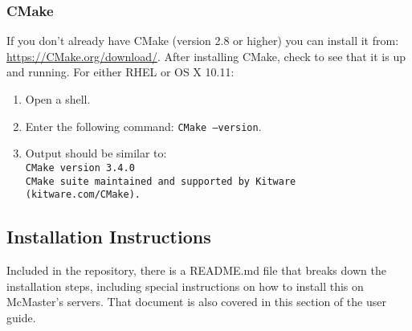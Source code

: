 \documentclass[12pt]{article}
\begin{document}
\subsubsection{CMake}
If you don't already have CMake (version 2.8 or higher) you can install it from: \url{https://CMake.org/download/}. After installing CMake, check to see that it is up and running. For either RHEL or OS X 10.11:
\begin{enumerate}
\item Open a shell.
\item Enter the following command: \texttt{CMake --version}.
\item Output should be similar to:\\
\texttt{CMake version 3.4.0}\\
\texttt{CMake suite maintained and supported by Kitware (kitware.com/CMake).}
\end{enumerate}

\subsection{Installation Instructions} %
Included in the repository, there is a README.md file that breaks down the installation steps, including special instructions on how to install this on McMaster's servers. That document is also covered in this section of the user guide.
\end{document}
